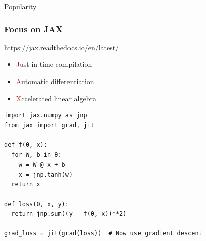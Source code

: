 \documentclass[
    xcolor={svgnames,dvipsnames},
    hyperref={colorlinks, citecolor=DeepPink4, linkcolor=DarkRed, urlcolor=DarkBlue}
    ]{beamer}  %
\newcommand{\brown}[1]{\textcolor{Brown}{\sf #1}}
\newcommand{\1}{\mathbbm 1}
\begin{document}
\begin{frame}
    
    Popularity

    
    \begin{figure}
       \begin{center}
       \end{center}
    \end{figure}


\end{frame}


\begin{frame}
    \frametitle{Focus on JAX}

    \url{https://jax.readthedocs.io/en/latest/}
    
            \vspace{0.5em}
    \begin{itemize}
        \item \brown{J}ust-in-time compilation
            \vspace{0.5em}
        \item \brown{A}utomatic differentiation
            \vspace{0.5em}
        \item \brown{X}ccelerated linear algebra
    \end{itemize}

            \vspace{0.5em}
            \vspace{0.5em}

\end{frame}


\begin{frame}[fragile]
    
    \vspace{-1em}
    \begin{verbatim}
import jax.numpy as jnp
from jax import grad, jit

def f(θ, x):
  for W, b in θ:
    w = W @ x + b
    x = jnp.tanh(w)  
  return x

def loss(θ, x, y):
  return jnp.sum((y - f(θ, x))**2)

grad_loss = jit(grad(loss))  # Now use gradient descent 
    \end{verbatim}

\end{frame}
\end{document}
